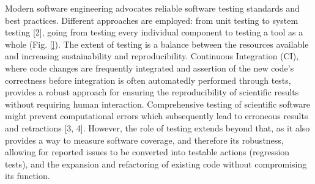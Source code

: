 Modern software engineering advocates reliable software testing standards and best practices. Different approaches are employed: from unit testing to system testing \cite{krafczyk_scientific_2019}[2], going from testing every individual component to testing a tool as a whole (Fig. \ref{}). The extent of testing is a balance between the resources available and increasing sustainability and reproducibility. Continuous Integration (CI), where code changes are frequently integrated and assertion of the new code’s correctness before integration is often automatedly performed through tests, provides a robust approach for ensuring the reproducibility of scientific results without requiring human interaction. Comprehensive testing of scientific software might prevent computational errors which subsequently lead to erroneous results and retractions \cite{}[3, 4]. However, the role of testing extends beyond that, as it also provides a way to measure software coverage, and therefore its robustness, allowing for reported issues to be converted into testable actions (regression tests), and the expansion and refactoring of existing code without compromising its function.
